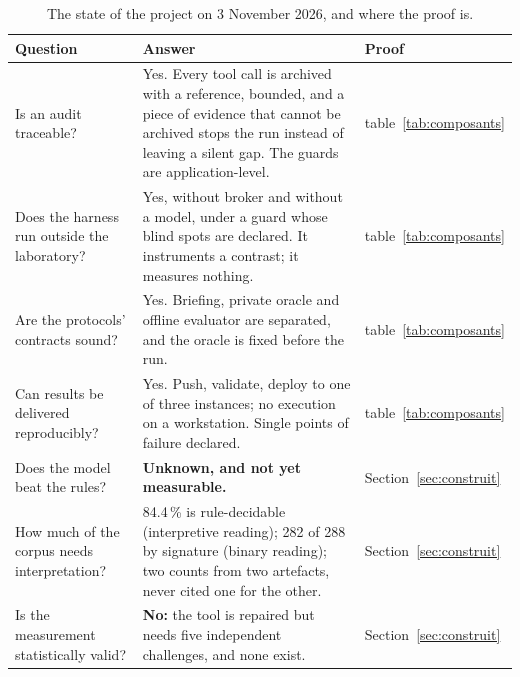 \begin{table}[H]
\centering
\caption{The state of the project on 3 November 2026, and where the proof is.}
\label{tab:etat-chiffre}
\small
\begin{tabularx}{\linewidth}{@{}p{3.9cm}Yp{2.6cm}@{}}
\toprule
Question & Answer & \textbf{Proof} \\
\midrule
Is an audit traceable? & Yes. Every tool call is archived with a reference,
bounded, and a piece of evidence that cannot be archived stops the run instead of
leaving a silent gap. The guards are application-level. & table~\ref{tab:composants} \\
Does the harness run outside the laboratory? & Yes, without broker and without a
model, under a guard whose blind spots are declared. It instruments a contrast; it
measures nothing. & table~\ref{tab:composants} \\
Are the protocols' contracts sound? & Yes. Briefing, private oracle and offline
evaluator are separated, and the oracle is fixed before the run. & table~\ref{tab:composants} \\
Can results be delivered reproducibly? & Yes. Push, validate, deploy to one of
three instances; no execution on a workstation. Single points of failure declared.
& table~\ref{tab:composants} \\
Does the model beat the rules? & \textbf{Unknown, and not yet measurable.} & Section~\ref{sec:construit} \\
How much of the corpus needs interpretation? & 84.4\,\% is rule-decidable
(interpretive reading); 282 of 288 by signature (binary reading); two counts from
two artefacts, never cited one for the other. & Section~\ref{sec:construit} \\
Is the measurement statistically valid? & \textbf{No:} the tool is repaired but
needs five independent challenges, and none exist. & Section~\ref{sec:construit} \\
\bottomrule
\end{tabularx}
\end{table}
